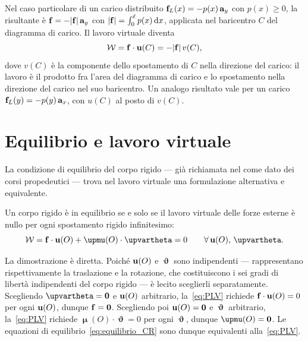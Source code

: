 Nel caso particolare di un carico distribuito
$\mathbf{f}_L(x) = -p(x)\,\mathbf{a}_y$ con $p(x) \geq 0$, la risultante
è $\mathbf{f} = -|\mathbf{f}|\,\mathbf{a}_y$ con $|\mathbf{f}| = \int_0^\ell p(x)\,\mathrm{d} x$,
applicata nel baricentro $C$ del diagramma di carico. Il
lavoro virtuale diventa
\begin{equation}
	\mathcal{W} = \mathbf{f} \cdot \mathbf{u}(C) = -|\mathbf{f}|\,v(C),
\end{equation}
dove $v(C)$ è la componente dello spostamento di $C$ nella
direzione del carico: il lavoro è il prodotto fra l'area
del diagramma di carico e lo spostamento nella direzione
del carico nel suo baricentro. Un analogo risultato vale
per un carico $\mathbf{f}_L(y) = -p(y)\,\mathbf{a}_x$, con $u(C)$
al posto di $v(C)$.



\section{Equilibrio e lavoro virtuale}
\label{sec:equilibrio_LV}

La condizione di equilibrio del corpo rigido --- già
richiamata nel  come dato dei corsi
propedeutici --- trova nel lavoro virtuale una formulazione
alternativa e equivalente.

\begin{teorema}
	Un corpo rigido è in equilibrio se e solo se il lavoro
	virtuale delle forze esterne è nullo per ogni
	spostamento rigido infinitesimo:
	\begin{equation}\label{eq:PLV}
		\Wc = \fb \cdot \ub(O)
		+ \bm{\upmu}(O) \cdot \bm{\upvartheta} = 0
		\qquad \forall\,\ub(O),\,\bm{\upvartheta}.
	\end{equation}
\end{teorema}
La dimostrazione è diretta. Poiché $\mathbf{u}(O)$ e
$\bm{\upvartheta}$ sono indipendenti --- rappresentano
rispettivamente la traslazione e la rotazione, che
costituiscono i sei gradi di libertà indipendenti del
corpo rigido --- è lecito sceglierli separatamente.
Scegliendo $\bm{\upvartheta} = \zerovb$ e $\mathbf{u}(O)$
arbitrario, la~\eqref{eq:PLV} richiede
$\mathbf{f} \cdot \mathbf{u}(O) = 0$ per ogni $\mathbf{u}(O)$, dunque
$\mathbf{f} = \mathbf{0}$. Scegliendo poi $\mathbf{u}(O) = \mathbf{0}$ e
$\bm{\upvartheta}$ arbitrario, la~\eqref{eq:PLV} richiede
$\bm{\upmu}(O) \cdot \bm{\upvartheta} = 0$ per ogni
$\bm{\upvartheta}$, dunque $\bm{\upmu}(O) = \zerovb$.
Le equazioni di equilibrio~\eqref{eq:equilibrio_CR}
sono dunque equivalenti alla~\eqref{eq:PLV}.


